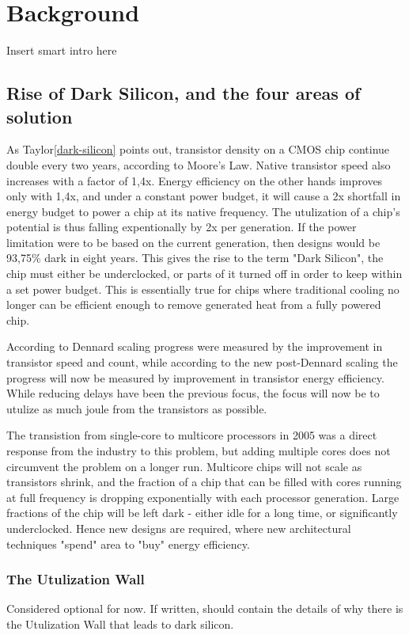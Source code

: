 \chapter{Background}
\label{cha:background}

Insert smart intro here


\section{Rise of Dark Silicon, and the four areas of solution}
\label{sec:dark-silicon}
As Taylor\ref{dark-silicon} points out, transistor density on a CMOS chip continue double every two years, according to Moore's Law.
Native transistor speed also increases with a factor of 1,4x.
Energy efficiency on the other hands improves only with 1,4x, and under a constant power budget, it will cause a 2x shortfall in energy budget to power a chip at its native frequency.
The utulization of a chip's potential is thus falling expentionally by 2x per generation.
If the power limitation were to be based on the current generation, then designs would be 93,75\% dark in eight years.
This gives the rise to the term "Dark Silicon", the chip must either be underclocked, or parts of it turned off in order to keep within a set power budget.
This is essentially true for chips where  traditional cooling no longer can be efficient enough to remove generated heat from a fully powered chip.

According to Dennard scaling progress were measured by the improvement in transistor speed and count, while according to the new post-Dennard scaling the progress will now be measured by improvement in transistor energy efficiency.
While reducing delays have been the previous focus, the focus will now be to utulize as much joule from the transistors as possible.

The transistion from single-core to multicore processors in 2005 was a direct response from the industry to this problem, but adding multiple cores does not circumvent the problem on a longer run.
Multicore chips will not scale as transistors shrink, and the fraction of a chip that can be filled with cores running at full frequency is dropping exponentially with each processor generation. 
Large fractions of the chip will be left dark - either idle for a long time, or significantly underclocked.
Hence new designs are required, where new architectural techniques "spend" area to "buy" energy efficiency.

\subsection{The Utulization Wall}
Considered optional for now.
If written, should contain the details of why there is the Utulization Wall that leads to dark silicon. 


